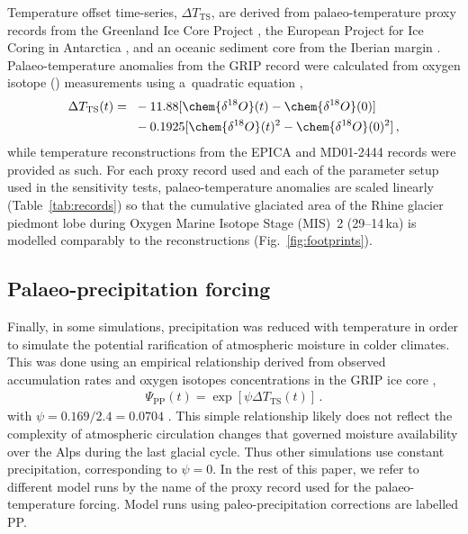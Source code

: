 \documentclass[tc, manuscript]{copernicus}
\begin{document}
    Temperature offset time-series, ${\Delta}T_{\text{TS}}$, are derived from
    palaeo-temperature proxy records from the Greenland Ice Core Project
    \citep[GRIP,][]{Dansgaard.etal.1993}, the European Project for Ice Coring
    in Antarctica \citep[EPICA,][] {Jouzel.etal.2007}, and an oceanic sediment
    core from the Iberian margin \citep[MD01-2444,][]{Martrat.etal.2007}.
    Palaeo-temperature anomalies from the GRIP record were calculated from
    oxygen isotope () measurements using a~quadratic
    equation \citep{Johnsen.etal.1995},
    \begin{align}
      {\Delta}T_{\text{TS}}(t) ={~}&-11.88 [\chem{\delta^{18}O}(t)
                                    -\chem{\delta^{18}O}(0)] \nonumber \\
                                   &-0.1925 [\chem{\delta^{18}O}(t)^2
                                    -\chem{\delta^{18}O}(0)^2] \,,
    \end{align}
    while temperature reconstructions from the EPICA and MD01-2444 records were
    provided as such. For each proxy record used and each of the parameter
    setup used in the sensitivity tests, palaeo-temperature anomalies are
    scaled linearly (Table~\ref{tab:records}) so that the cumulative glaciated
    area of the Rhine glacier piedmont lobe during Oxygen Marine Isotope Stage
    (MIS)~2 (29--14\,ka) is modelled comparably to the reconstructions
    (Fig.~\ref{fig:footprints}).


\subsection{Palaeo-precipitation forcing}
\label{sec:palprec}

    Finally, in some simulations, precipitation was reduced with temperature in
    order to simulate the potential rarification of atmospheric moisture in
    colder climates. This was done using an empirical relationship derived from
    observed accumulation rates and oxygen isotopes concentrations in the GRIP
    ice core \citep{Dahl-Jensen.etal.1993},
    \begin{align}
      {\Psi}_{\text{PP}}(t) = \exp[\psi{\Delta}T_{\text{TS}}(t)] \,.
    \end{align}
    with $\psi=0.169/2.4=0.0704$ \citep{Huybrechts.2002}. This simple
    relationship likely does not reflect the complexity of atmospheric
    circulation changes that governed moisture availability over the Alps
    during the last glacial cycle. Thus other simulations use constant
    precipitation, corresponding to $\psi=0$. In the rest of this paper, we
    refer to different model runs by the name of the proxy record used for the
    palaeo-temperature forcing. Model runs using paleo-precipitation
    corrections are labelled PP.
\end{document}
